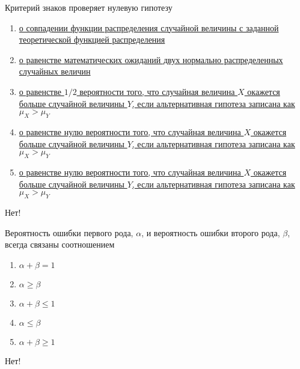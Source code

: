 \documentclass[t]{beamer}
\begin{document}
 \begin{frame} \label{26-No} 
\begin{block}{26} 

Критерий знаков проверяет нулевую гипотезу
 


 \end{block} 
\begin{enumerate} 
\item[] \hyperlink{26-No}{\beamergotobutton{} о совпадении функции распределения случайной величины с заданной теоретической функцией распределения}
\item[] \hyperlink{26-No}{\beamergotobutton{} о равенстве математических ожиданий двух нормально распределенных случайных величин}
\item[] \hyperlink{26-No}{\beamergotobutton{} о равенстве $1/2$ вероятности того, что случайная величина $X$ окажется больше случайной величины $Y$, если альтернативная гипотеза записана как $\mu_X>\mu_Y$}
\item[] \hyperlink{26-No}{\beamergotobutton{} о равенстве нулю вероятности того, что случайная величина $X$ окажется больше случайной величины $Y$, если альтернативная гипотеза записана как $\mu_X>\mu_Y$ }
\item[] \hyperlink{26-Yes}{\beamergotobutton{} о равенстве нулю вероятности того, что случайная величина $X$ окажется больше случайной величины $Y$, если альтернативная гипотеза записана как $\mu_X>\mu_Y$}
\end{enumerate} 

 \alert{Нет!} 
\end{frame} 


 \begin{frame} \label{27-No} 
\begin{block}{27} 

Вероятность ошибки первого рода, $\alpha$, и вероятность ошибки второго рода, $\beta$, всегда связаны соотношением
 


 \end{block} 
\begin{enumerate} 
\item[] \hyperlink{27-No}{\beamergotobutton{} $\alpha+\beta=1$}
\item[] \hyperlink{27-No}{\beamergotobutton{} $\alpha\geq \beta $}
\item[] \hyperlink{27-No}{\beamergotobutton{} $\alpha+\beta \leq 1$}
\item[] \hyperlink{27-No}{\beamergotobutton{} $\alpha\leq \beta $}
\item[] \hyperlink{27-No}{\beamergotobutton{} $\alpha+\beta \geq 1$}
\end{enumerate} 

 \alert{Нет!} 
\end{frame} 
\end{document}
